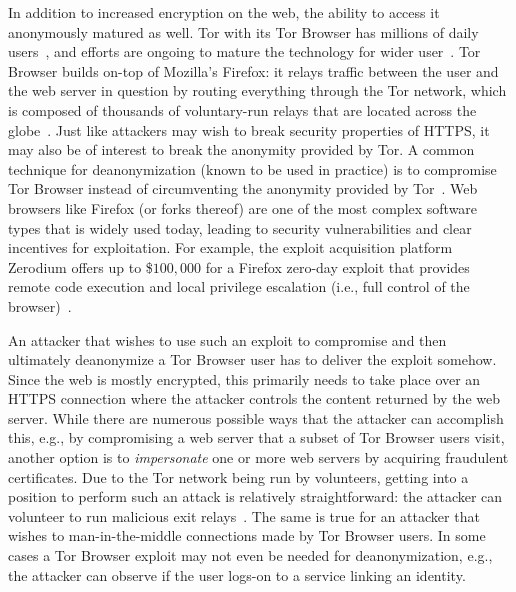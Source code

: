 In addition to increased encryption on the web, the ability to access it
anonymously matured as well.  Tor with its Tor Browser has millions of daily
users~\cite{tor,mani}, and efforts are ongoing to mature the technology 
for wider user~\cite{fftor}.  Tor Browser builds on-top of Mozilla's Firefox:
	it relays traffic between the user and the web server in question by routing
		everything through the Tor network,
	which is composed of thousands of voluntary-run relays that are located
		across the globe~\cite{relay-by-flag}.
Just like attackers may wish to break security properties of HTTPS, it may also
be of interest to break the anonymity provided by Tor.  A common technique for
deanonymization (known to be used in practice) is to compromise Tor
Browser instead of circumventing the anonymity provided by
Tor~\cite{selfrando,lepop1,lepop2,zerotor}.  Web browsers like Firefox
(or forks thereof) are one of the most complex software types that is widely
used today, leading to security vulnerabilities and clear incentives for
exploitation.  For example, the exploit acquisition platform Zerodium offers up
to \$$100,000$ for a Firefox zero-day exploit that provides remote code
execution and local privilege escalation (i.e., full control of the
browser)~\cite{zeromain}.

An attacker that wishes to use such an exploit to compromise and then ultimately
deanonymize a Tor Browser user has to deliver the exploit somehow.  Since the
web is mostly encrypted, this primarily needs to take place over an HTTPS
connection where the attacker controls the content returned by the web server.
While there are numerous possible ways that the attacker can accomplish this,
e.g., by compromising a web server that a subset of Tor Browser users visit,
another option is to \emph{impersonate} one or more web servers by acquiring
fraudulent certificates. Due to the Tor network being run by volunteers, getting
into a position to perform such an attack is relatively straightforward:
	the attacker can volunteer to run malicious exit
		relays~\cite{spoiled-onions}.
The same is true for an attacker that wishes to man-in-the-middle connections
made by Tor Browser users.  In some cases a Tor Browser exploit may not even be
needed for deanonymization, e.g., the attacker can observe if the user logs-on
to a service linking an identity.

